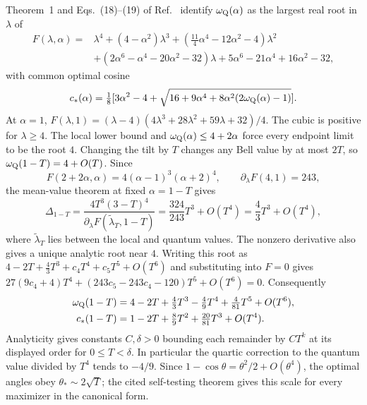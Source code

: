 \documentclass[11pt]{article}
\theoremstyle{remark}\newtheorem{remark}[theorem]{Remark}
\begin{document}
Theorem~1 and Eqs.~(18)--(19) of Ref.~\cite{GigenaEtAl2025} identify
$\omega_{\rm Q}(\alpha)$ as the largest real root in $\lambda$ of
\begin{align}
F(\lambda,\alpha)={}&\lambda^4+(4-\alpha^2)\lambda^3
+(\tfrac{11}{4}\alpha^4-12\alpha^2-4)\lambda^2\nonumber\\
&+(2\alpha^6-\alpha^4-20\alpha^2-32)\lambda
+5\alpha^6-21\alpha^4+16\alpha^2-32,
\label{supp:eq:exact-quartic}
\end{align}
with common optimal cosine
\begin{equation}
c_*(\alpha)=\tfrac18[3\alpha^2-4+
\sqrt{16+9\alpha^4+8\alpha^2(2\omega_{\rm Q}(\alpha)-1)}].
\label{supp:eq:exact-optimal-cosine}
\end{equation}
At $\alpha=1$,
$F(\lambda,1)=(\lambda-4)(4\lambda^3+28\lambda^2+59\lambda+32)/4$.
The cubic is positive for $\lambda\geq4$. The local lower bound and
$\omega_{\rm Q}(\alpha)\leq4+2\alpha$ force every endpoint limit to be
the root $4$. Changing the tilt by $T$ changes any Bell value by at most
$2T$, so $\omega_{\rm Q}(1-T)=4+O(T)$. Since
\[
F(2+2\alpha,\alpha)=4(\alpha-1)^3(\alpha+2)^4,
\qquad \partial_\lambda F(4,1)=243,
\]
the mean-value theorem at fixed $\alpha=1-T$ gives
\begin{equation}
\Delta_{1-T}=\frac{4T^3(3-T)^4}
{\partial_\lambda F(\widetilde\lambda_T,1-T)}
=\frac{324}{243}T^3+O(T^4)=\frac43T^3+O(T^4),
\label{supp:eq:quantum-advantage}
\end{equation}
where $\widetilde\lambda_T$ lies between the local and quantum values.
The nonzero derivative also gives a unique analytic root near $4$.
Writing this root as
$4-2T+\frac43T^3+c_4T^4+c_5T^5+O(T^6)$ and substituting into $F=0$ gives
$27(9c_4+4)T^4+(243c_5-243c_4-120)T^5+O(T^6)=0$.
Consequently
\begin{align}
\omega_{\rm Q}(1-T)&=4-2T+\tfrac43T^3-\tfrac49T^4
+\tfrac4{81}T^5+O(T^6),
\label{supp:eq:exact-endpoint-expansion}\\
c_*(1-T)&=1-2T+\tfrac89T^2+\tfrac{20}{81}T^3+O(T^4).
\label{supp:eq:optimal-cosine-expansion}
\end{align}
Analyticity gives constants $C,\delta>0$ bounding each remainder by $CT^k$
at its displayed order for $0\leq T<\delta$. In particular the quartic
correction to the quantum value divided by $T^4$ tends to $-4/9$.
Since $1-\cos\theta=\theta^2/2+O(\theta^4)$, the optimal angles obey
$\theta_*\sim2\sqrt T$; the cited self-testing theorem gives this scale
for every maximizer in the canonical form.
\end{document}
